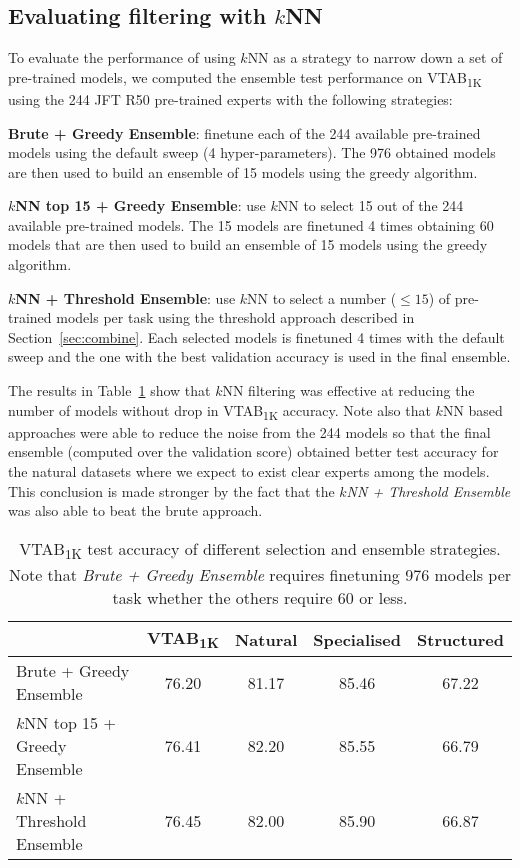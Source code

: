 \documentclass{article} \usepackage{iclr2021_conference,times}
\begin{document}
\subsection{Evaluating filtering with \texorpdfstring{$k$NN}{kNN}}
\label{app:knn-headroom}


To evaluate the performance of using $k$NN as a strategy to narrow down a set of pre-trained models, we computed the ensemble test performance on VTAB\textsubscript{1K} using the 244 JFT R50 pre-trained experts with the following strategies:

\textbf{Brute + Greedy Ensemble}: finetune each of the 244 available pre-trained models using the default sweep (4 hyper-parameters). The 976 obtained models are then used to build an ensemble of 15 models using the greedy algorithm.

\textbf{$k$NN top 15 + Greedy Ensemble}: use $k$NN to select 15 out of the 244 available  pre-trained models. The 15 models are finetuned 4 times obtaining 60 models that are then used to build an ensemble of 15 models using the greedy algorithm.

\textbf{$k$NN + Threshold Ensemble}: use $k$NN to select a number ($\leq 15$) of pre-trained models per task using the threshold approach described in Section~\ref{sec:combine}. Each selected models is finetuned 4 times with the default sweep and the one with the best validation accuracy is used in the final ensemble.



The results in Table~\ref{tab:knn-headroom} show that $k$NN filtering was effective at reducing the number of models without drop in VTAB\textsubscript{1K} accuracy. Note also that $k$NN based approaches were able to reduce the noise from the 244 models so that the final ensemble (computed over the validation score) obtained better test accuracy for the natural datasets where we expect to exist clear experts among the models. This conclusion is made stronger by the fact that the \emph{$k$NN + Threshold Ensemble} was also able to beat the brute approach.

\begin{table}[!htb]
\centering
\begin{tabular}{@{}l|c|ccc@{}}
\toprule
                             & VTAB\textsubscript{1K}  & Natural & Specialised & Structured \\ \midrule
Brute + Greedy Ensemble      & 76.20  &  81.17  &  85.46  &  67.22     \\
$k$NN top 15 + Greedy Ensemble  & 76.41  &  82.20  &  85.55  &  66.79     \\ 
$k$NN + Threshold Ensemble         & 76.45  &  82.00  &  85.90  &  66.87     \\ \bottomrule
\end{tabular}
\caption{VTAB\textsubscript{1K} test accuracy of different selection and ensemble strategies. Note that \emph{Brute + Greedy Ensemble} requires finetuning 976 models per task whether the others require 60 or less.}
\label{tab:knn-headroom}
\end{table}
\end{document}
